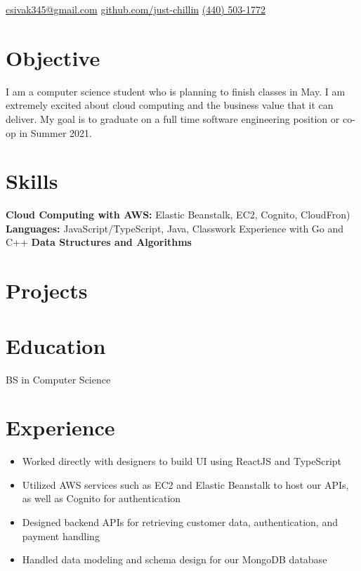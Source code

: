\documentclass{cv}
\begin{document}
	
	\contact
		{\faEnvelopeSquare\space\href{mailto:csivak345@gmail.com}{csivak345@gmail.com}}
		{\faGithub\space\url{github.com/just-chillin}}
		{\faPhone\space\href{tel:14405031772}{(440) 503-1772}}
	
	\section{Objective}
	\begin{flushleft}
		I am a computer science student who is planning to finish classes in May. I am extremely excited about cloud computing and the business value that it can deliver. My goal is to graduate on a full time software engineering position or co-op in Summer 2021.
	\end{flushleft}

	
	\section{Skills}
	\textbf{Cloud Computing with AWS:} Elastic Beanstalk, EC2, Cognito, CloudFron)\newline
	\textbf{Languages:} JavaScript/TypeScript, Java, Classwork Experience with Go and C++\newline
	\textbf{Data Structures and Algorithms}
	
	\section{Projects}
	

	\section{Education}
	BS in Computer Science

	\section{Experience}
	\begin{itemize}
		\item Worked directly with designers to build UI using ReactJS and TypeScript
		\item Utilized AWS services such as EC2 and Elastic Beanstalk to host our APIs, as well as Cognito for authentication
		\item Designed backend APIs for retrieving customer data, authentication, and payment handling
		\item Handled data modeling and schema design for our MongoDB database
	\end{itemize}
\end{document}
